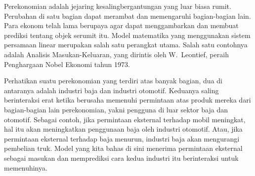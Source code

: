 Perekonomian adalah jejaring kesalingbergantungan yang luar biasa rumit.
Perubahan di satu bagian dapat merambat dan memengaruhi bagian-bagian lain.
Para ekonom telah lama berupaya agar dapat menggambarkan dan membuat
prediksi tentang objek serumit itu.
Model matematika yang menggunakan sistem persamaan linear
merupakan salah satu perangkat utama.
Salah satu contohnya adalah Analisis Masukan-Keluaran, yang dirintis oleh
W.~Leontief,
peraih Penghargaan Nobel Ekonomi tahun 1973.

Perhatikan suatu perekonomian yang terdiri atas banyak bagian, dua di antaranya
adalah industri baja dan industri otomotif.
Keduanya saling berinteraksi erat
ketika berusaha memenuhi permintaan atas produk mereka
dari bagian-bagian lain perekonomian, yakni pengguna di luar sektor baja dan
otomotif.
Sebagai contoh, jika permintaan eksternal terhadap mobil meningkat, hal itu
akan meningkatkan penggunaan baja oleh industri otomotif.
Atau, jika permintaan eksternal terhadap baja menurun, industri baja akan
mengurangi pembelian truk.
Model yang
kita bahas di sini menerima permintaan eksternal sebagai masukan
dan memprediksi cara kedua industri itu berinteraksi untuk memenuhinya.

